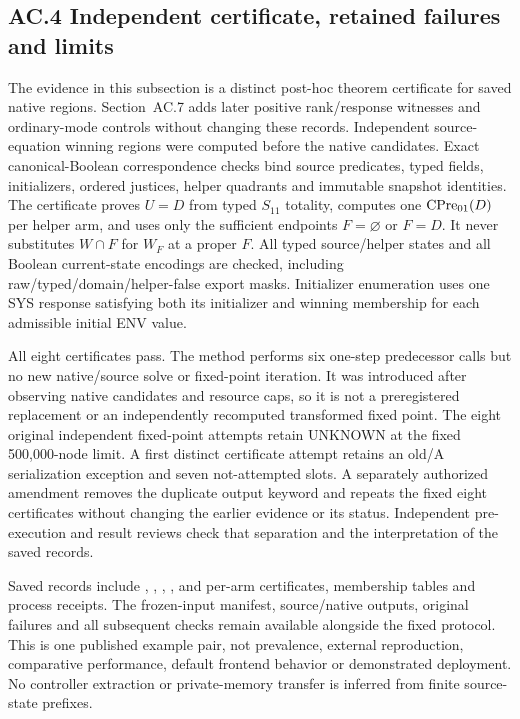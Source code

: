 \subsection*{AC.4 Independent certificate, retained failures and limits}
The evidence in this subsection is a distinct post-hoc theorem certificate
for saved native regions. Section~AC.7 adds later positive rank/response
witnesses and ordinary-mode controls without changing these records. Independent source-equation winning regions were computed
before the native candidates. Exact canonical-Boolean correspondence
checks bind source predicates, typed fields, initializers, ordered justices,
helper quadrants and immutable snapshot identities. The certificate proves
$U=D$ from typed $S_{11}$ totality, computes one $\operatorname{CPre}_{01}(D)$ per
helper arm, and uses only the sufficient endpoints $F=\varnothing$ or
$F=D$. It never substitutes $W\cap F$ for $W_F$ at a proper $F$.
All typed source/helper states and all Boolean current-state encodings
are checked, including raw/typed/domain/helper-false export masks.
Initializer enumeration uses one SYS response satisfying both its
initializer and winning membership for each admissible initial ENV value.

All eight certificates pass. The method performs six one-step predecessor
calls but no new native/source solve or fixed-point iteration. It was
introduced after observing native candidates and resource caps, so it is
not a preregistered replacement or an independently recomputed transformed
fixed point. The eight original independent fixed-point attempts retain
UNKNOWN at the fixed 500,000-node limit. A first distinct certificate
attempt retains an old/A serialization exception and seven not-attempted
slots. A separately authorized amendment removes the duplicate output
keyword and repeats the fixed eight certificates without changing the
earlier evidence or its status. Independent pre-execution and result
reviews check that separation and the interpretation of the saved records.

Saved records include ,
, ,
, and per-arm certificates, membership
tables and process receipts. The frozen-input manifest, source/native
outputs, original failures and all subsequent checks remain available
alongside the fixed protocol. This is one published example pair, not
prevalence, external reproduction, comparative performance, default
frontend behavior or demonstrated deployment. No controller extraction
or private-memory transfer is inferred from finite source-state prefixes.


